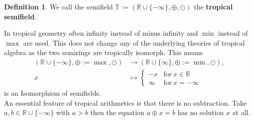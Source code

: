 \documentclass{article}
\theoremstyle{definition}
\newtheorem{definition}[theorem]{Definition}
\begin{document}
\begin{definition}
We call the semifield $\mathbb{T} := ( \mathbb{R} \cup \{- \infty \} , \oplus , \odot )$ the \textbf{tropical semifield}.
\end{definition}

In tropical geometry often infinity instead of minus infinity and $\min$ instead of $\max$ are used. This does not change any of the underlying theories of tropical algebra as the two semirings are tropically isomorph. This means
\begin{align*}
( \mathbb{R} \cup \{- \infty \} , \oplus := \max, \odot ) &\to ( \mathbb{R} \cup \{ \infty \} , \oplus := \min , \odot ), \\
x &\mapsto \begin{cases} -x & \text{for} \ x \in \mathbb{R}\\
\infty & \text{for} \ x = - \infty
\end{cases}
\end{align*}
is an Isomorphism of semifields. \\
An essential feature of tropical arithmetics is that there is no subtraction. Take $a, b \in \mathbb{R} \cup \{- \infty \}$ with $a > b$ then the equation $a \oplus x=b$ has no solution $x$ at all. \cite[p.~11]{maclagan2015introduction} \\
\end{document}
